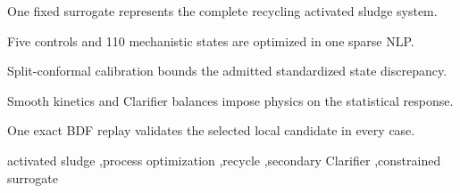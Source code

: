 \documentclass[a4paper,fleqn]{cas-sc}
\begin{document}
\begin{highlights}
\item One fixed surrogate represents the complete recycling activated sludge system.
\item Five controls and 110 mechanistic states are optimized in one sparse NLP.
\item Split-conformal calibration bounds the admitted standardized state discrepancy.
\item Smooth kinetics and Clarifier balances impose physics on the statistical response.
\item One exact BDF replay validates the selected local candidate in every case.
\end{highlights}

\begin{keywords}
activated sludge \sep process optimization \sep recycle \sep secondary Clarifier \sep constrained surrogate
\end{keywords}

\maketitle
\end{document}
